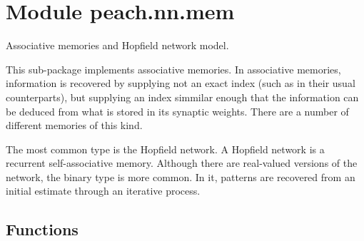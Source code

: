 %
%
%


\section{Module peach.nn.mem}

    \label{peach:nn:mem}

Associative memories and Hopfield network model.

This sub-package implements associative memories. In associative memories,
information is recovered by supplying not an exact index (such as in their
usual counterparts), but supplying an index simmilar enough that the information
can be deduced from what is stored in its synaptic weights. There are a number
of different memories of this kind.

The most common type is the Hopfield network. A Hopfield network is a recurrent
self-associative memory. Although there are real-valued versions of the network,
the binary type is more common. In it, patterns are recovered from an initial
estimate through an iterative process.


  \subsection{Functions}

    \label{peach:nn:rbfn:randn}

    \vspace{0.5ex}

